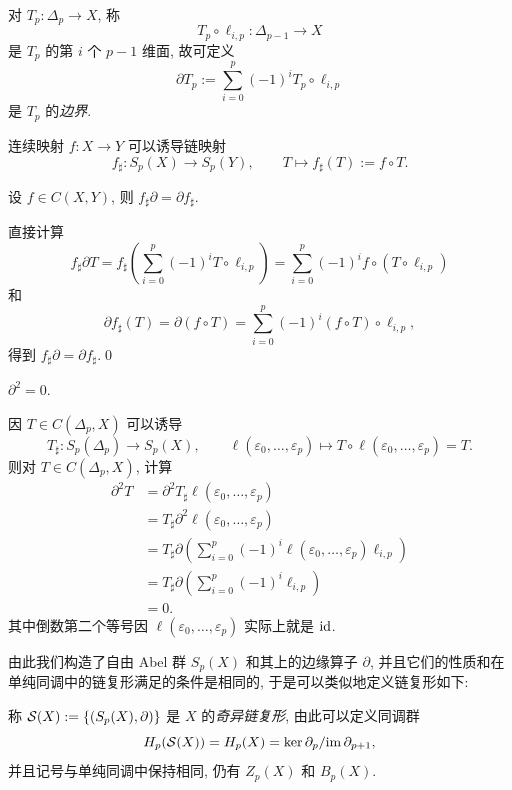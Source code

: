 \begin{Definition}[奇异单形的边界]
	对 $ T_p : \Delta_p\to X $, 称
	\[
		T_p\circ\ell_{i,p} : \Delta_{p-1}\to X
	\]
	是 $ T_p $ 的第 $ i $ 个 $ p-1 $ 维面, 故可定义
	\[
		\partial T_p:=\sum_{i=0}^p(-1)^iT_p\circ\ell_{i,p}
	\]
	是 $ T_p $ 的\emph{边界}.
\end{Definition}

连续映射 $ f : X\to Y $ 可以诱导链映射
\[
	f_\sharp : S_p(X)\to S_p(Y),\qquad T\mapsto f_\sharp(T):=f\circ T.
\]

\begin{Proposition}
	设 $ f\in C(X,Y) $, 则 $ f_\sharp\partial=\partial f_\sharp $.
\end{Proposition}
\begin{Proof}
	直接计算
	\[
		f_\sharp\partial T=f_\sharp\left( \sum_{i=0}^p(-1)^iT\circ\ell_{i,p} \right)=\sum_{i=0}^p(-1)^if\circ (T\circ\ell_{i,p})
	\]
	和
	\[
		\partial f_\sharp(T)=\partial(f\circ T)=\sum_{i=0}^p(-1)^i(f\circ T)\circ\ell_{i,p},
	\]
	得到 $ f_\sharp\partial=\partial f_\sharp $.\qed
\end{Proof}

\begin{Theorem}
	$ \partial^2=0 $.
\end{Theorem}
\begin{Proof}
	因 $ T\in C(\Delta_p,X) $ 可以诱导
	\[
		T_\sharp : S_p(\Delta_p)\to S_p(X),\qquad \ell(\varepsilon_0,\dots,\varepsilon_p)\mapsto T\circ\ell(\varepsilon_0,\dots,\varepsilon_p)=T.
	\]
	则对 $ T\in C(\Delta_p,X) $, 计算
	\[
		\begin{aligned}
			\partial^2T&=\partial^2T_\sharp\ell(\varepsilon_0,\dots,\varepsilon_p)\\
			&=T_\sharp\partial^2\ell(\varepsilon_0,\dots,\varepsilon_p)\\
			&=T_\sharp\partial\left( \sum_{i=0}^p(-1)^i\ell(\varepsilon_0,\dots,\varepsilon_p)\ell_{i,p} \right)\\
			&=T_\sharp\partial\left( \sum_{i=0}^p(-1)^i\ell_{i,p} \right)\\
			&=0.
		\end{aligned}
	\]
	其中倒数第二个等号因 $ \ell(\varepsilon_0,\dots,\varepsilon_p) $ 实际上就是 $ \mathrm{id} $.
\end{Proof}

由此我们构造了自由 Abel 群 $ S_p(X) $ 和其上的边缘算子 $ \partial $, 并且它们的性质和在单纯同调中的链复形满足的条件是相同的, 于是可以类似地定义链复形如下:

\begin{Definition}[奇异链复形]
	称 $ \mathcal{S}(X):=\left\{ (S_p(X),\partial) \right\} $ 是 $ X $ 的\emph{奇异链复形}, 由此可以定义同调群
	\[
		H_p(\mathcal{S}(X))=H_p(X)=\ker\partial_p/\mathrm{im}\,\partial_{p+1},
	\] 
	并且记号与单纯同调中保持相同, 仍有 $ Z_p(X) $ 和 $ B_p(X) $.
\end{Definition}

